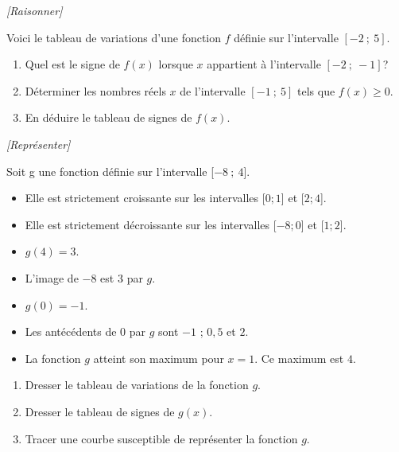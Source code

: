 \exo \textit{[Raisonner]}
\smallskip

Voici le tableau de variations d'une fonction $f$ définie sur l'intervalle $[-2~;~5]$.

\begin{center}
\end{center}

\begin{enumerate}
\item Quel est le signe de $f(x)$ lorsque $x$ appartient à l'intervalle $[-2~;~-1]$?
\item Déterminer les nombres réels $x$ de l'intervalle  $[-1~;~5]$ tels que $f(x) \geqslant 0$.
\item En déduire le tableau de signes de $f(x)$.
\end{enumerate}





\exo \textit{[Représenter]}

Soit g une fonction définie sur l’intervalle [$-8~;~4$].
\begin{itemize}[label=,leftmargin=2cm]
\item Elle est strictement croissante sur les intervalles [$0 ;1$] et [$2 ;4$].
\item Elle est strictement décroissante sur les intervalles [$-8 ;0$] et [$1 ;2$].
\item $g(4) = 3$.
\item L’image de $-8$ est $3$ par $g$.
\item $g(0) = -1$.
\item Les antécédents de $0$ par $g$ sont $-1$ ; $0,5$ et $2$.
\item La fonction $g$ atteint son maximum pour $x = 1$. Ce maximum est $4$.
\end{itemize}

\begin{enumerate}[label=\arabic*.]
\item  Dresser le tableau de variations de la fonction $g$.
\item  Dresser le tableau de signes de $g(x)$.
\item  Tracer une courbe susceptible de représenter la fonction $g$. 
\end{enumerate}

